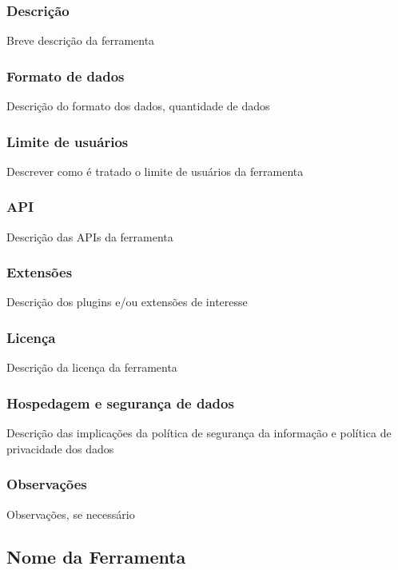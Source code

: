 \documentclass[a4paper, 12pt]{article}
\begin{document}
\subsubsection{Descrição}
Breve descrição da ferramenta

\subsubsection{Formato de dados}
Descrição do formato dos dados, quantidade de dados

\subsubsection{Limite de usuários}
Descrever como é tratado o limite de usuários da ferramenta

\subsubsection{API}
Descrição das APIs da ferramenta

\subsubsection{Extensões}
Descrição dos plugins e/ou extensões de interesse

\subsubsection{Licença}
Descrição da licença da ferramenta

\subsubsection{Hospedagem e segurança de dados}
Descrição das implicações da política de segurança da informação e política de privacidade dos dados

\subsubsection{Observações}
Observações, se necessário

\clearpage

\subsection{Nome da Ferramenta}
\end{document}
